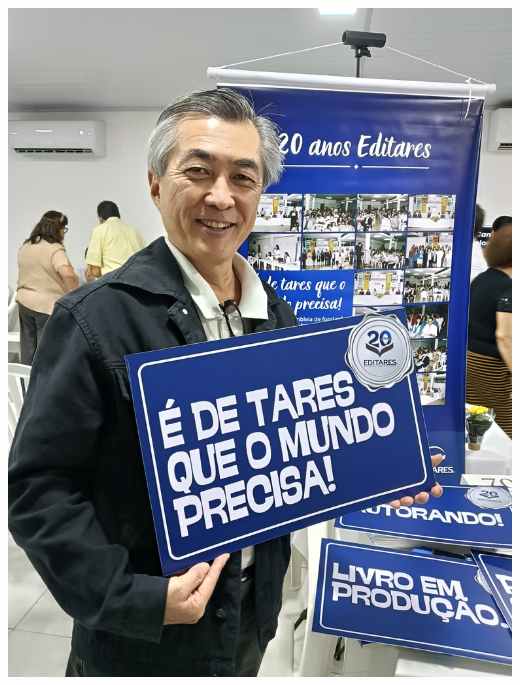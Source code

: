 \documentclass{gescons}
\begin{document}
  \begin{minipage}[b]{0.32\textwidth}
    \includegraphics[width=\linewidth]{articles/resumo/fotos/materia2/IMG20241208145756.jpg}
  \end{minipage}\hfill
\end{document}
